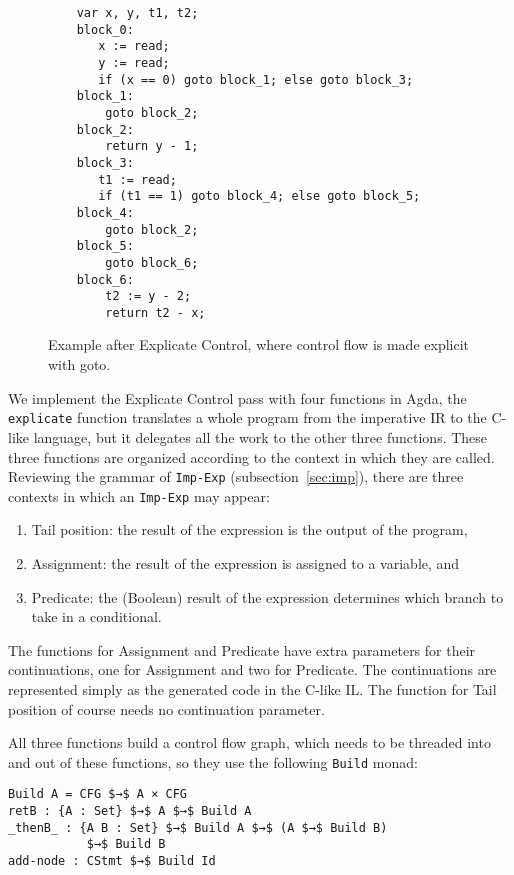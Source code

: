 \documentclass[sigplan,screen]{acmart}
\begin{document}
\begin{figure}[tp]
\begin{lstlisting}
    var x, y, t1, t2;
    block_0:
       x := read;
       y := read;
       if (x == 0) goto block_1; else goto block_3;
    block_1:
        goto block_2;
    block_2:
        return y - 1;
    block_3:
       t1 := read;
       if (t1 == 1) goto block_4; else goto block_5;
    block_4:
        goto block_2;
    block_5:
        goto block_6;
    block_6:
        t2 := y - 2;
        return t2 - x;
\end{lstlisting}
  \caption{Example after Explicate Control, where control flow
    is made explicit with goto.}
\label{fig:running-example-goto}
\end{figure}

We implement the Explicate Control pass with four functions in Agda,
the \lstinline{explicate} function translates a whole program from the
imperative IR to the C-like language, but it delegates all the work to
the other three functions. These three functions are organized
according to the context in which they are called. Reviewing the
grammar of \lstinline{Imp-Exp} (subsection~\ref{sec:imp}), there are
three contexts in which an \lstinline{Imp-Exp} may appear:
\begin{enumerate}
\item Tail position: the result of the expression is the output of the program,
\item Assignment: the result of the expression is assigned to a variable, and
\item Predicate: the (Boolean) result of the expression determines which
    branch to take in a conditional.
\end{enumerate}

The functions for Assignment and Predicate have extra parameters for
their continuations, one for Assignment and two for Predicate. The
continuations are represented simply as the generated code in the
C-like IL. The function for Tail position of course needs no
continuation parameter.

All three functions build a control flow graph, which needs to be
threaded into and out of these functions, so they use the following
\lstinline{Build} monad:

\begin{lstlisting}
Build A = CFG $→$ A × CFG
retB : {A : Set} $→$ A $→$ Build A
_thenB_ : {A B : Set} $→$ Build A $→$ (A $→$ Build B)
           $→$ Build B
add-node : CStmt $→$ Build Id
\end{lstlisting}
\end{document}

